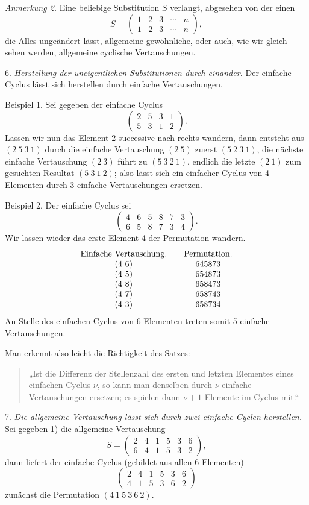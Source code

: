 \documentclass[10pt]{article}
\begin{document}
\emph{Anmerkung 2.} Eine beliebige Substitution \(S\) verlangt, abgesehen von der einen
\[
S=\begin{pmatrix}1&2&3&\cdots&n\\1&2&3&\cdots&n\end{pmatrix},
\]
die Alles ungeändert lässt, allgemeine gewöhnliche, oder auch, wie wir gleich sehen werden, allgemeine cyclische Vertauschungen.

6. \emph{Herstellung der uneigentlichen Substitutionen durch einander.} Der einfache Cyclus lässt sich herstellen durch einfache Vertauschungen.

Beispiel 1. Sei gegeben der einfache Cyclus
\[
\begin{pmatrix}2&5&3&1\\5&3&1&2\end{pmatrix}.
\]
Lassen wir nun das Element 2 successive nach rechts wandern, dann entsteht aus \((2\ 5\ 3\ 1)\) durch die einfache Vertauschung \((2\ 5)\) zuerst \((5\ 2\ 3\ 1)\), die nächste einfache Vertauschung \((2\ 3)\) führt zu \((5\ 3\ 2\ 1)\), endlich die letzte \((2\ 1)\) zum gesuchten Resultat \((5\ 3\ 1\ 2)\); also lässt sich ein einfacher Cyclus von 4 Elementen durch 3 einfache Vertauschungen ersetzen.

Beispiel 2. Der einfache Cyclus sei
\[
\begin{pmatrix}4&6&5&8&7&3\\6&5&8&7&3&4\end{pmatrix}.
\]
Wir lassen wieder das erste Element 4 der Permutation wandern.
\[
\begin{array}{c@{\qquad}c}
\text{Einfache Vertauschung.} & \text{Permutation.}\\
(4\ 6)&645873\\
(4\ 5)&654873\\
(4\ 8)&658473\\
(4\ 7)&658743\\
(4\ 3)&658734
\end{array}
\]
An Stelle des einfachen Cyclus von 6 Elementen treten somit 5 einfache Vertauschungen.

Man erkennt also leicht die Richtigkeit des Satzes:
\begin{quote}
„Ist die Differenz der Stellenzahl des ersten und letzten Elementes eines einfachen Cyclus \(\nu\), so kann man denselben durch \(\nu\) einfache Vertauschungen ersetzen; es spielen dann \(\nu+1\) Elemente im Cyclus mit.“
\end{quote}

7. \emph{Die allgemeine Vertauschung lässt sich durch zwei einfache Cyclen herstellen.} Sei gegeben 1) die allgemeine Vertauschung
\[
S=\begin{pmatrix}2&4&1&5&3&6\\6&4&1&5&3&2\end{pmatrix},
\]
dann liefert der einfache Cyclus (gebildet aus allen 6 Elementen)
\[
\begin{pmatrix}2&4&1&5&3&6\\4&1&5&3&6&2\end{pmatrix}
\]
zunächst die Permutation \((4\ 1\ 5\ 3\ 6\ 2)\).
\end{document}
